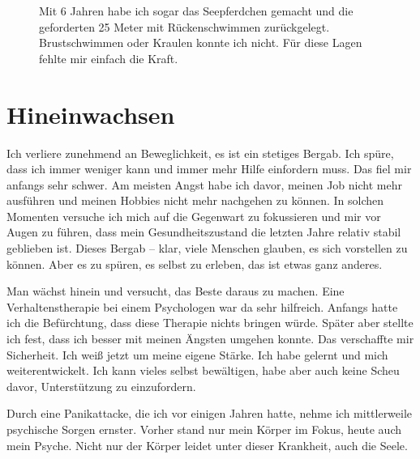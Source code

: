 \documentclass[fontsize=14pt,a4paper,headinclude,DIV=calc,automark]{scrbook}
\begin{document}
\setlength{\fboxsep}{0pt}    %
\setlength{\fboxrule}{0.2pt} %
\begin{figure}[H]
    \centering
    \caption{Mit 6 Jahren habe ich sogar das Seepferdchen gemacht und die geforderten 25 Meter mit Rückenschwimmen zurückgelegt. Brustschwimmen oder Kraulen konnte ich nicht. Für diese Lagen fehlte mir einfach die Kraft.}
    \label{fig:seepferdchen}
\end{figure}

\section{Hineinwachsen}

Ich verliere zunehmend an Beweglichkeit, es ist ein stetiges Bergab. Ich spüre, dass ich immer weniger kann und immer mehr Hilfe einfordern muss. Das fiel mir anfangs sehr schwer. Am meisten Angst habe ich davor, meinen Job nicht mehr ausführen und meinen Hobbies nicht mehr nachgehen zu können. In solchen Momenten versuche ich mich auf die Gegenwart zu fokussieren und mir vor Augen zu führen, dass mein Gesundheitszustand die letzten Jahre relativ stabil geblieben ist. Dieses Bergab – klar, viele Menschen glauben, es sich vorstellen zu können. Aber es zu spüren, es selbst zu erleben, das ist etwas ganz anderes.

Man wächst hinein und versucht, das Beste daraus zu machen. Eine Verhaltenstherapie bei einem Psychologen war da sehr hilfreich. Anfangs hatte ich die Befürchtung, dass diese Therapie nichts bringen würde. Später aber stellte ich fest, dass ich besser mit meinen Ängsten umgehen konnte. Das verschaffte mir Sicherheit. Ich weiß jetzt um meine eigene Stärke. Ich habe gelernt und mich weiterentwickelt. Ich kann vieles selbst bewältigen, habe aber auch keine Scheu davor, Unterstützung zu einzufordern.

Durch eine Panikattacke, die ich vor einigen Jahren hatte, nehme ich mittlerweile psychische Sorgen ernster. Vorher stand nur mein Körper im Fokus, heute auch mein Psyche. Nicht nur der Körper leidet unter dieser Krankheit, auch die Seele.
\end{document}
